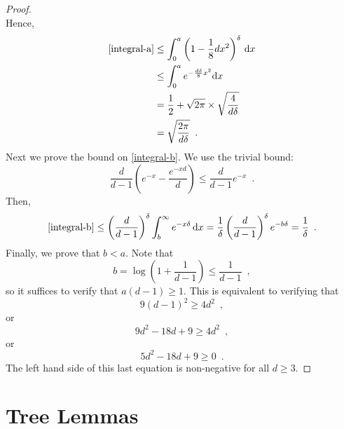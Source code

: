 \documentclass{patmorin}
\begin{document}
\begin{proof}
\[   \]
   Hence,
   \begin{align*}
      \eqref{integral-a} 
        & \le \int_0^a\left(1-\frac{1}{8}dx^2\right)^\delta \, \mathrm{d}x \\
        & \le \int_0^a e^{-\frac{d\delta}{8}x^2} \mathrm{d}x \\
        & = \frac{1}{2}+\sqrt{2\pi}\times\sqrt{\frac{4}{d\delta}} \\
        & = \sqrt{\frac{2\pi}{d\delta}} \enspace .
   \end{align*}
   Next we prove the bound on \eqref{integral-b}.  We use the trivial bound:
   \[
       \frac{d}{d-1}\left(e^{-x}-\frac{e^{-xd}}{d}\right) 
         \le \frac{d}{d-1}e^{-x}
       \enspace .
   \]
   Then,
   \[
      \eqref{integral-b} \le \left(\frac{d}{d-1}\right)^\delta
       \int_b^\infty e^{-x\delta} \,\mathrm{d}x 
       = \frac{1}{\delta}\left(\frac{d}{d-1}\right)^\delta e^{-b\delta}
       = \frac{1}{\delta} \enspace .
   \]
   Finally, we prove that $b<a$.  Note that 
   \[  b=\log\left(1+\frac{1}{d-1}\right)  \le \frac{1}{d-1} \enspace , \]
   so it suffices to verify that $a(d-1)\ge 1$.  This is equivalent to verifying
   that
   \[ 9(d-1)^2 \ge 4d^2 \enspace , \]
   or
   \[ 9d^2 - 18d + 9 \ge 4d^2 \enspace , \]
   or
   \[ 5d^2 - 18d + 9 \ge 0 \enspace . \]
   The left hand side of this last equation is non-negative for all $d\ge 3$.
\end{proof}

\section{Tree Lemmas}
\end{document}
